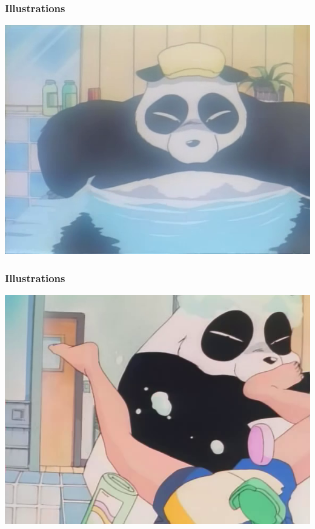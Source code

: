 \documentclass{beamer}
\begin{document}
\begin{frame}
\frametitle{Illustrations}
\begin{center}
\includegraphics[scale=0.5]{./images/Leak02.png}
\end{center}
\end{frame}
\begin{frame}
\frametitle{Illustrations}
\begin{center}
\includegraphics[scale=0.5]{./images/Leak03.png}
\end{center}
\end{frame}
\end{document}
